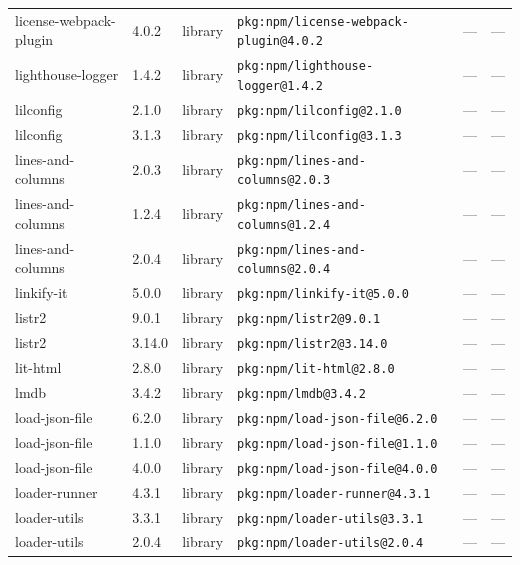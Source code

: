 \documentclass[11pt,a4paper]{article}
\begin{document}
\begin{longtable}{|p{4cm}|p{2cm}|p{1.6cm}|p{5cm}|p{1.5cm}|p{3.5cm}|}
\raggedright license-webpack-plugin & 4.0.2 & library & \small\texttt{pkg:npm/license-webpack-plugin@4.0.2} & — & \small — \\
\raggedright lighthouse-logger & 1.4.2 & library & \small\texttt{pkg:npm/lighthouse-logger@1.4.2} & — & \small — \\
\raggedright lilconfig & 2.1.0 & library & \small\texttt{pkg:npm/lilconfig@2.1.0} & — & \small — \\
\raggedright lilconfig & 3.1.3 & library & \small\texttt{pkg:npm/lilconfig@3.1.3} & — & \small — \\
\raggedright lines-and-columns & 2.0.3 & library & \small\texttt{pkg:npm/lines-and-columns@2.0.3} & — & \small — \\
\raggedright lines-and-columns & 1.2.4 & library & \small\texttt{pkg:npm/lines-and-columns@1.2.4} & — & \small — \\
\raggedright lines-and-columns & 2.0.4 & library & \small\texttt{pkg:npm/lines-and-columns@2.0.4} & — & \small — \\
\raggedright linkify-it & 5.0.0 & library & \small\texttt{pkg:npm/linkify-it@5.0.0} & — & \small — \\
\raggedright listr2 & 9.0.1 & library & \small\texttt{pkg:npm/listr2@9.0.1} & — & \small — \\
\raggedright listr2 & 3.14.0 & library & \small\texttt{pkg:npm/listr2@3.14.0} & — & \small — \\
\raggedright lit-html & 2.8.0 & library & \small\texttt{pkg:npm/lit-html@2.8.0} & — & \small — \\
\raggedright lmdb & 3.4.2 & library & \small\texttt{pkg:npm/lmdb@3.4.2} & — & \small — \\
\raggedright load-json-file & 6.2.0 & library & \small\texttt{pkg:npm/load-json-file@6.2.0} & — & \small — \\
\raggedright load-json-file & 1.1.0 & library & \small\texttt{pkg:npm/load-json-file@1.1.0} & — & \small — \\
\raggedright load-json-file & 4.0.0 & library & \small\texttt{pkg:npm/load-json-file@4.0.0} & — & \small — \\
\raggedright loader-runner & 4.3.1 & library & \small\texttt{pkg:npm/loader-runner@4.3.1} & — & \small — \\
\raggedright loader-utils & 3.3.1 & library & \small\texttt{pkg:npm/loader-utils@3.3.1} & — & \small — \\
\raggedright loader-utils & 2.0.4 & library & \small\texttt{pkg:npm/loader-utils@2.0.4} & — & \small — \\

\end{longtable}
\end{document}
